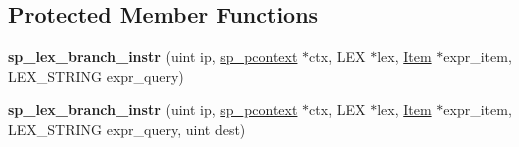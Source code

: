 \subsection*{Protected Member Functions}
\begin{DoxyCompactItemize}
\item 
\mbox{\label{classsp__lex__branch__instr_a413a569356494220d3cab6ac1b7d9cb7}} 
{\bfseries sp\+\_\+lex\+\_\+branch\+\_\+instr} (uint ip, \mbox{\hyperlink{classsp__pcontext}{sp\+\_\+pcontext}} $\ast$ctx, L\+EX $\ast$lex, \mbox{\hyperlink{classItem}{Item}} $\ast$expr\+\_\+item, L\+E\+X\+\_\+\+S\+T\+R\+I\+NG expr\+\_\+query)
\item 
\mbox{\label{classsp__lex__branch__instr_a472e3cd9c07f29fa4dcb776f0d13985e}} 
{\bfseries sp\+\_\+lex\+\_\+branch\+\_\+instr} (uint ip, \mbox{\hyperlink{classsp__pcontext}{sp\+\_\+pcontext}} $\ast$ctx, L\+EX $\ast$lex, \mbox{\hyperlink{classItem}{Item}} $\ast$expr\+\_\+item, L\+E\+X\+\_\+\+S\+T\+R\+I\+NG expr\+\_\+query, uint dest)
\end{DoxyCompactItemize}
